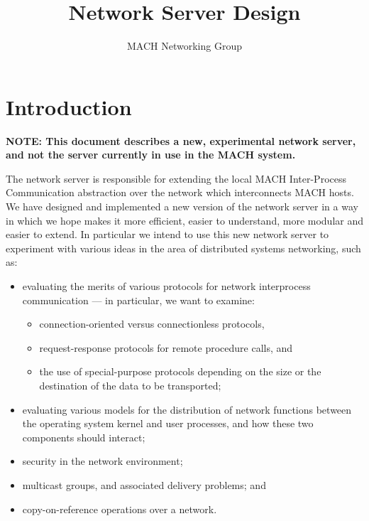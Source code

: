 %
%
%
%

%
%
%

\title{Network Server Design}
\author{MACH Networking Group}



\maketitle

\section{Introduction}

{\bf NOTE: This document describes a new, experimental network server,
and not the server currently in use in the MACH system.}

The network server is responsible for extending the
local MACH Inter-Process Communication abstraction over the network which
interconnects MACH hosts.  We have designed and implemented a new version of
the network server in a way in which we hope makes it more efficient, easier
to understand, more modular and easier to extend.  In particular we intend
to use this new network server to experiment with various ideas in the area
of distributed systems networking, such as:
\begin{itemize}
\item
evaluating the merits of various protocols for network interprocess
communication --- in particular, we want to examine:
\begin{itemize}
\item connection-oriented versus connectionless protocols,

\item request-response protocols for remote procedure calls, and

\item the use of special-purpose protocols depending on the size or the destination
of the data to be transported;
\end{itemize}

\item evaluating various models for the distribution of network functions between the
operating system kernel and user processes, and how these two components
should interact;

\item security in the network environment;

\item multicast groups, and associated delivery problems; and

\item copy-on-reference operations over a network.
\end{itemize}


